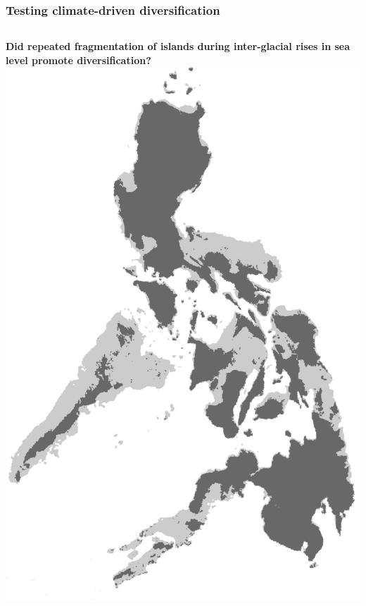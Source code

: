 \begin{frame}
    \frametitle{Testing climate-driven diversification}
    \begin{columns}[c]
    \textbf{Did repeated fragmentation of islands during inter-glacial rises in sea level
    promote diversification?}\\
    \bigskip
            \includegraphics[width=\textwidth]{images/maps/Philippines.png}
    \end{columns}
\end{frame}


